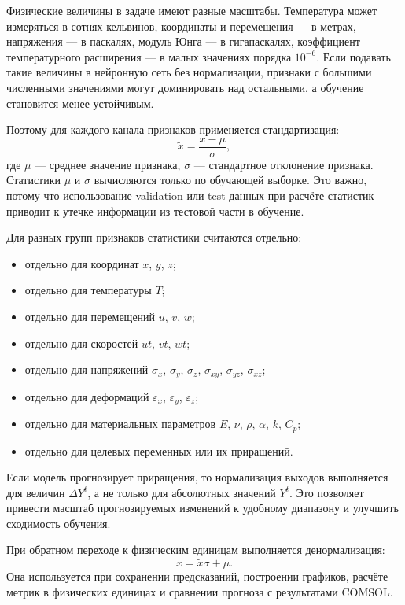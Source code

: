 Физические величины в задаче имеют разные масштабы. Температура может измеряться в сотнях кельвинов, координаты и перемещения --- в метрах, напряжения --- в паскалях, модуль Юнга --- в гигапаскалях, коэффициент температурного расширения --- в малых значениях порядка $10^{-6}$. Если подавать такие величины в нейронную сеть без нормализации, признаки с большими численными значениями могут доминировать над остальными, а обучение становится менее устойчивым.

Поэтому для каждого канала признаков применяется стандартизация:
\begin{equation}
    \tilde{x}=\frac{x-\mu}{\sigma},
\end{equation}
где $\mu$ --- среднее значение признака, $\sigma$ --- стандартное отклонение признака. Статистики $\mu$ и $\sigma$ вычисляются только по обучающей выборке. Это важно, потому что использование validation или test данных при расчёте статистик приводит к утечке информации из тестовой части в обучение.

Для разных групп признаков статистики считаются отдельно:
\begin{itemize}
    \item отдельно для координат $x$, $y$, $z$;
    \item отдельно для температуры $T$;
    \item отдельно для перемещений $u$, $v$, $w$;
    \item отдельно для скоростей $ut$, $vt$, $wt$;
    \item отдельно для напряжений $\sigma_x$, $\sigma_y$, $\sigma_z$, $\sigma_{xy}$, $\sigma_{yz}$, $\sigma_{xz}$;
    \item отдельно для деформаций $\varepsilon_x$, $\varepsilon_y$, $\varepsilon_z$;
    \item отдельно для материальных параметров $E$, $\nu$, $\rho$, $\alpha$, $k$, $C_p$;
    \item отдельно для целевых переменных или их приращений.
\end{itemize}

Если модель прогнозирует приращения, то нормализация выходов выполняется для величин $\Delta Y^t$, а не только для абсолютных значений $Y^t$. Это позволяет привести масштаб прогнозируемых изменений к удобному диапазону и улучшить сходимость обучения.

При обратном переходе к физическим единицам выполняется денормализация:
\begin{equation}
    x=\tilde{x}\sigma+\mu.
\end{equation}
Она используется при сохранении предсказаний, построении графиков, расчёте метрик в физических единицах и сравнении прогноза с результатами COMSOL.

